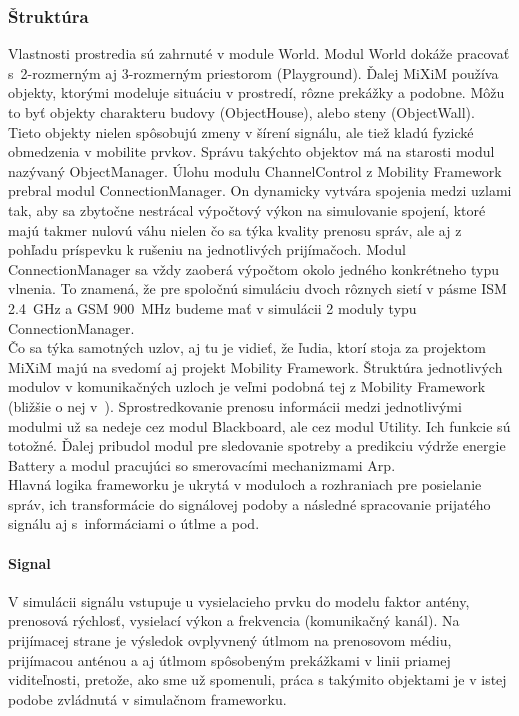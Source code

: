 \subsubsection{Štruktúra}
\indent\indent Vlastnosti prostredia sú zahrnuté v module \ttfamily World\rmfamily . Modul \ttfamily World \rmfamily dokáže pracovať s~2-rozmerným aj 3-rozmerným priestorom (\ttfamily Playground\rmfamily). Ďalej MiXiM používa objekty, ktorými modeluje situáciu v prostredí, rôzne prekážky a podobne. Môžu to byť objekty charakteru budovy (\ttfamily ObjectHouse\rmfamily), alebo steny (\ttfamily ObjectWall\rmfamily). Tieto objekty nielen spôsobujú zmeny v šírení signálu, ale tiež kladú fyzické obmedzenia v mobilite prvkov. Správu takýchto objektov má na starosti modul nazývaný \ttfamily ObjectManager\rmfamily. Úlohu modulu \ttfamily ChannelControl \rmfamily z Mobility Framework prebral modul \ttfamily ConnectionManager\rmfamily. On dynamicky vytvára spojenia medzi uzlami tak, aby sa zbytočne nestrácal výpočtový výkon na simulovanie spojení, ktoré majú takmer nulovú váhu nielen čo sa týka kvality prenosu správ, ale aj z pohľadu príspevku k rušeniu na jednotlivých prijímačoch. Modul \ttfamily ConnectionManager \rmfamily sa vždy zaoberá výpočtom okolo jedného konkrétneho typu vlnenia. To znamená, že pre spoločnú simuláciu dvoch rôznych sietí v pásme ISM 2.4~GHz a GSM 900~MHz budeme mať v simulácii 2 moduly typu \ttfamily ConnectionManager\rmfamily.\\ 
\indent Čo sa týka samotných uzlov, aj tu je vidieť, že ľudia, ktorí stoja za projektom MiXiM majú na svedomí aj projekt Mobility Framework. Štruktúra jednotlivých modulov v komunikačných uzloch je veľmi podobná tej z Mobility Framework (bližšie o nej v~\cite{halas03}). Sprostredkovanie prenosu informácii medzi jednotlivými modulmi už sa nedeje cez modul \ttfamily Blackboard\rmfamily, ale cez modul \ttfamily Utility\rmfamily. Ich funkcie sú totožné. Ďalej pribudol modul pre sledovanie spotreby a predikciu výdrže energie \ttfamily Battery \rmfamily a modul pracujúci so smerovacími mechanizmami \ttfamily Arp\rmfamily.\\
\indent Hlavná logika frameworku je ukrytá v moduloch a rozhraniach pre posielanie správ, ich transformácie do signálovej podoby a následné spracovanie prijatého signálu aj s~informáciami o útlme a pod.
\paragraph{Signal}
\indent V simulácii signálu vstupuje u vysielacieho prvku do modelu faktor antény, prenosová rýchlosť, vysielací výkon a frekvencia (komunikačný kanál). Na prijímacej strane je výsledok ovplyvnený útlmom na prenosovom médiu, prijímacou anténou a aj útlmom spôsobeným prekážkami v linii priamej viditeľnosti, pretože, ako sme už spomenuli, práca s takýmito objektami je v istej podobe zvládnutá v simulačnom frameworku.
